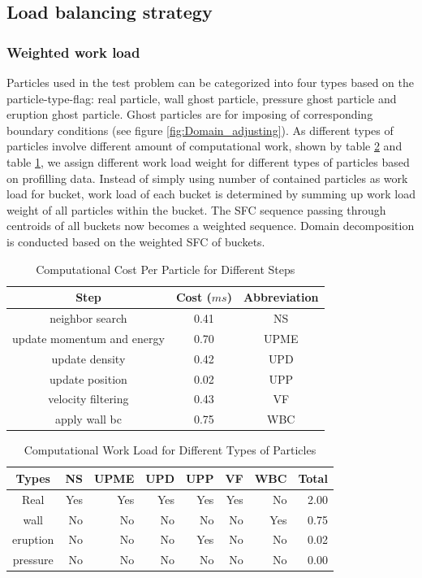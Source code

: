 \documentclass[conference,compsoc]{IEEEtran}
\begin{document}
\subsection{Load balancing strategy}
\subsubsection{Weighted work load}
Particles used in the test problem can be categorized into four types based on the particle-type-flag: real particle, wall ghost particle, pressure ghost particle and eruption ghost particle. Ghost particles are for imposing of corresponding boundary conditions (see figure \ref{fig:Domain_adjusting}). As different types of particles involve different amount of computational work, shown by table \ref{tab:Computational_cost_particles} and table \ref{tab:Computational_cost_steps}, we assign different work load weight for different types of particles based on profilling data. Instead of simply using number of contained particles as work load for bucket, work load of each bucket is determined by summing up work load weight of all particles within the bucket. The SFC sequence passing through centroids of all buckets now becomes a weighted sequence. Domain decomposition  is conducted based on the weighted SFC of buckets.
\begin{table}[t!]
  \renewcommand{\arraystretch}{1.2}
  \centering
  \caption{Computational Cost Per Particle for Different Steps}
  \label{tab:Computational_cost_steps}
  \begin{tabular}{|c|c|c|}
    \hline
    Step & Cost ($ms$) & Abbreviation\\
    \hline
    neighbor search & 0.41 & NS\\
    \hline
    update momentum and energy & 0.70 & UPME\\
    \hline
    update density & 0.42 & UPD\\
    \hline
    update position & 0.02 & UPP\\
    \hline
    velocity filtering& 0.43 & VF\\
    \hline
    apply wall bc & 0.75 & WBC\\
    \hline
  \end{tabular}
\end{table}
\begin{table}[t!]
  \renewcommand{\arraystretch}{1.2}
  \centering
  \caption{Computational Work Load for Different Types of Particles}
  \label{tab:Computational_cost_particles}
  \begin{tabular}{|c|r|r|r|r|r|r|r|}
    \hline
    Types & NS & UPME & UPD & UPP &VF &WBC &Total\\
    \hline
    Real & Yes & Yes & Yes & Yes & Yes & No & 2.00\\
    \hline
    wall & No & No & No & No & No & Yes &0.75\\
    \hline
    eruption & No & No & No & Yes & No & No & 0.02\\
    \hline
    pressure & No & No & No & No & No & No & 0.00\\
    \hline
  \end{tabular}
\end{table}
\end{document}
